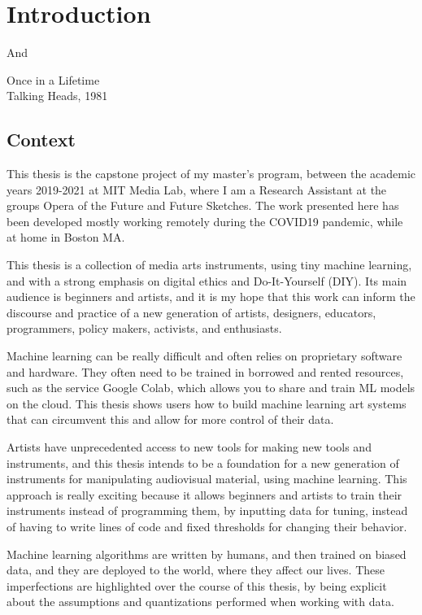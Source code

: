 \chapter{Introduction}

\epigraph{And}{Once in a Lifetime \\ Talking Heads, 1981}

\section{Context}

This thesis is the capstone project of my master's program, between the academic years 2019-2021 at MIT Media Lab, where I am a Research Assistant at the groups Opera of the Future and Future Sketches. The work presented here has been developed mostly working remotely during the COVID19 pandemic, while at home in Boston MA.

This thesis is a collection of media arts instruments, using tiny machine learning, and with a strong emphasis on digital ethics and Do-It-Yourself (DIY). Its main audience is beginners and artists, and it is my hope that this work can inform the discourse and practice of a new generation of artists,  designers, educators, programmers, policy makers, activists, and enthusiasts.

Machine learning can be really difficult and often relies on proprietary software and hardware. They often need to be trained in borrowed and rented resources, such as the service Google Colab, which allows you to share and train ML models on the cloud. This thesis shows users how to build machine learning art systems that can circumvent this and allow for more control of their data.

Artists have unprecedented access to new tools for making new tools and instruments, and this thesis intends to be a foundation for a new generation of instruments for manipulating audiovisual material, using machine learning. This approach is really exciting because it allows beginners and artists to train their instruments instead of programming them, by inputting data for tuning, instead of having to write lines of code and fixed thresholds for changing their behavior.

Machine learning algorithms are written by humans, and then trained on biased data, and they are deployed to the world, where they affect our lives. These imperfections are highlighted over the course of this thesis, by being explicit about the assumptions and quantizations performed when working with data.

